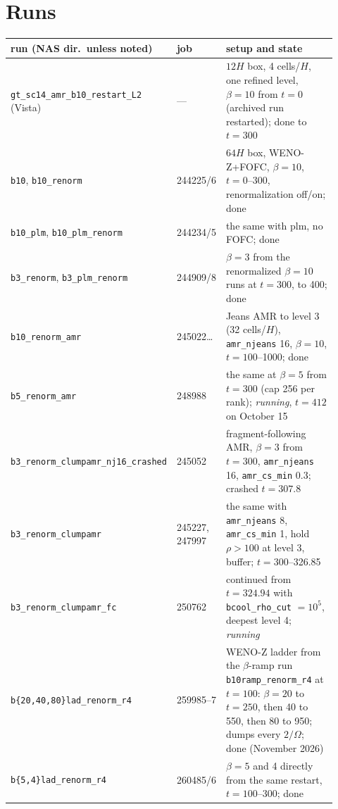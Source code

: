 \documentclass[11pt]{article}
\newcommand{\code}[1]{\texttt{#1}}
\newcommand{\Om}{\Omega}
\begin{document}
\tableofcontents
\clearpage

\section{Runs}

\begin{longtable}{@{}p{0.25\linewidth}p{0.12\linewidth}p{0.55\linewidth}@{}}
\toprule
run (NAS dir.\ unless noted) & job & setup and state \\
\midrule
\endhead
\code{gt\_sc14\_amr\_b10\_restart\_L2} (Vista) & --- & $12H$ box, 4 cells/$H$, one
  refined level, $\beta=10$ from $t = 0$ (archived run restarted); done to $t = 300$ \\
\code{b10}, \code{b10\_renorm} & 244225/6 & $64H$ box, WENO-Z+FOFC, $\beta=10$,
  $t=0$--300, renormalization off/on; done \\
\code{b10\_plm}, \code{b10\_plm\_renorm} & 244234/5 & the same with plm, no FOFC; done \\
\code{b3\_renorm}, \code{b3\_plm\_renorm} & 244909/8 & $\beta=3$ from the renormalized
  $\beta=10$ runs at $t=300$, to 400; done \\
\code{b10\_renorm\_amr} & 245022\ldots & Jeans AMR to level 3 (32 cells/$H$),
  \code{amr\_njeans} 16, $\beta = 10$, $t = 100$--1000; done \\
\code{b5\_renorm\_amr} & 248988 & the same at $\beta = 5$ from $t = 300$ (cap 256 per
  rank); \emph{running}, $t = 412$ on October 15 \\
\code{b3\_renorm\_clumpamr\_nj16\_crashed} & 245052 & fragment-following AMR, $\beta=3$
  from $t = 300$, \code{amr\_njeans} 16, \code{amr\_cs\_min} 0.3; crashed $t = 307.8$ \\
\code{b3\_renorm\_clumpamr} & 245227, 247997 & the same with \code{amr\_njeans} 8,
  \code{amr\_cs\_min} 1, hold $\rho > 100$ at level 3, buffer; $t = 300$--326.85 \\
\code{b3\_renorm\_clumpamr\_fc} & 250762 & continued from $t = 324.94$ with
  \code{bcool\_rho\_cut} $= 10^5$, deepest level 4; \emph{running} \\
\code{b\{20,40,80\}lad\_renorm\_r4} & 259985--7 & WENO-Z ladder from the $\beta$-ramp run
  \code{b10ramp\_renorm\_r4} at $t = 100$: $\beta = 20$ to $t = 250$, then 40 to 550, then
  80 to 950; dumps every $2/\Om$; done (November 2026) \\
\code{b\{5,4\}lad\_renorm\_r4} & 260485/6 & $\beta = 5$ and 4 directly from the same restart,
  $t = 100$--300; done \\
\bottomrule
\end{longtable}
\end{document}
